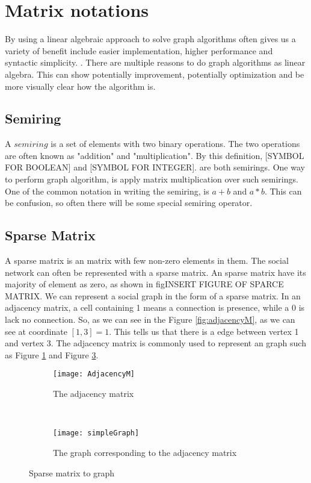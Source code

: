 \section{Matrix notations}
By using a linear algebraic approach to solve graph algorithms often gives us a variety of benefit include easier implementation, higher performance and syntactic simplicity. \cite{MathToAlgo}. There are multiple reasons to do graph algorithms as linear algebra. This can show potentially improvement, potentially optimization and be more visually clear how the algorithm is. 


\subsection{Semiring}
A $semiring$ is a set of elements with two binary operations. The two operations are often known as "addition" and "multiplication". By this definition, [SYMBOL FOR BOOLEAN] and [SYMBOL FOR INTEGER]. are both semirings.  One way to perform graph algorithm, is apply matrix multiplication over such semirings. One of the common notation in writing the semiring, is $a+b$ and $a \ast b$. This can be confusion, so often there will be some special semiring operator.

\subsection{Sparse Matrix}
A sparse matrix is an matrix with few non-zero elements in them. The social network can often be represented with a sparse matrix. An sparse matrix have its majority of element as zero, as shown in fig{INSERT FIGURE OF SPARCE MATRIX}. We can represent a social graph in the form of a sparse matrix. In an adjacency matrix, a cell containing 1 means a connection is presence, while a 0 is lack no connection. So, as we can see in the Figure \ref{fig:adjacencyM}, as we can see at coordinate $[1,3] = 1$. This tells us that there is a edge between vertex 1 and vertex 3. The adjacency matrix is commonly used to represent an graph such as Figure \ref{fig:AdjacencyM} and Figure \ref{fig:matrix}.

\begin{figure}
	\begin{subfigure}{0.5\textwidth}
	\texttt{[image: AdjacencyM]}
	\caption{The adjacency matrix}
	\label{fig:AdjacencyM}
	\end{subfigure}
	~
	\begin{subfigure}{0.5\textwidth}
	\texttt{[image: simpleGraph]}
	\caption{The graph corresponding to the adjacency matrix}
	\label{fig:matrix}
	\end{subfigure}
 	\caption{Sparse matrix to graph}
\end{figure}

